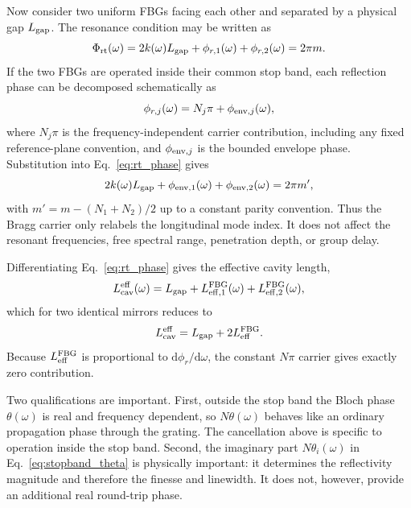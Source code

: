 \documentclass[aps,pra,twocolumn,superscriptaddress,nofootinbib]{revtex4-2}
\newcommand{\eff}{\mathrm{eff}}
\newcommand{\dd}{\mathrm{d}}
\begin{document}
Now consider two uniform FBGs facing each other and separated by a physical gap $L_{\rm gap}$.  The resonance condition may be written as
\begin{equation}
    \Phi_{\rm rt}(\omega)=2k(\omega)L_{\rm gap}
    +\phi_{r,1}(\omega)+\phi_{r,2}(\omega)=2\pi m.
    \label{eq:rt_phase}
\end{equation}
If the two FBGs are operated inside their common stop band, each reflection phase can be decomposed schematically as
\begin{equation}
    \phi_{r,j}(\omega)=N_j\pi+\phi_{{\rm env},j}(\omega),
    \label{eq:cavity_decomp}
\end{equation}
where $N_j\pi$ is the frequency-independent carrier contribution, including any fixed reference-plane convention, and $\phi_{{\rm env},j}$ is the bounded envelope phase.  Substitution into Eq.~\eqref{eq:rt_phase} gives
\begin{equation}
    2k(\omega)L_{\rm gap}+\phi_{{\rm env},1}(\omega)+\phi_{{\rm env},2}(\omega)
    =2\pi m',
\end{equation}
with $m'=m-(N_1+N_2)/2$ up to a constant parity convention.  Thus the Bragg carrier only relabels the longitudinal mode index.  It does not affect the resonant frequencies, free spectral range, penetration depth, or group delay.

Differentiating Eq.~\eqref{eq:rt_phase} gives the effective cavity length,
\begin{equation}
    L_{\rm cav}^\eff(\omega)=L_{\rm gap}
    +L_{\eff,1}^{\rm FBG}(\omega)+L_{\eff,2}^{\rm FBG}(\omega),
    \label{eq:cavity_length_general}
\end{equation}
which for two identical mirrors reduces to
\begin{equation}
    L_{\rm cav}^\eff=L_{\rm gap}+2L_\eff^{\rm FBG}.
\end{equation}
Because $L_\eff^{\rm FBG}$ is proportional to $\dd\phi_r/\dd\omega$, the constant $N\pi$ carrier gives exactly zero contribution.

Two qualifications are important.  First, outside the stop band the Bloch phase $\theta(\omega)$ is real and frequency dependent, so $N\theta(\omega)$ behaves like an ordinary propagation phase through the grating.  The cancellation above is specific to operation inside the stop band.  Second, the imaginary part $N\theta_i(\omega)$ in Eq.~\eqref{eq:stopband_theta} is physically important: it determines the reflectivity magnitude and therefore the finesse and linewidth.  It does not, however, provide an additional real round-trip phase.
\end{document}
